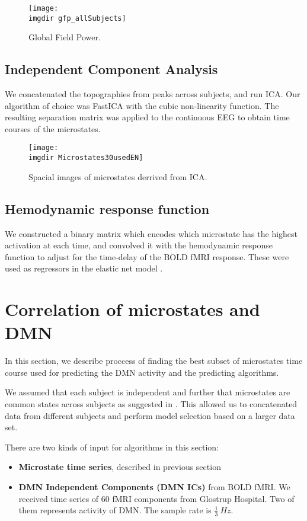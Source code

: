 \documentclass{article}
\newcommand{\imgdir}{Images/} %
\begin{document}
\begin{figure}[!ht]
    \centering
    \texttt{[image: \\imgdir gfp\_allSubjects]}
    \caption{Global Field Power.}
    \label{fig:gfp}
\end{figure}

\subsection{Independent Component Analysis}
We concatenated the topographies from peaks across subjects, and run ICA. Our algorithm of choice was FastICA \cite{fast_robust} with the cubic non-linearity function. The resulting separation matrix was applied to the continuous EEG to obtain time courses of the microstates.

\begin{figure}[!ht]
    \centering
    \texttt{[image: \\imgdir Microstates30usedEN]}
    \caption{Spacial images of microstates derrived from ICA.}
    \label{fig:microstates}
\end{figure}
\subsection{Hemodynamic response function}   
We constructed a binary matrix which encodes which microstate has the highest activation at each time, and convolved it with the hemodynamic response function to adjust for the time-delay of the BOLD fMRI response. These were used as regressors in the elastic net model \cite{hastie01}. 


\section{Correlation of microstates and DMN}
In this section, we describe proccess of finding the best subset of microstates time course used for predicting the DMN activity and the predicting algorithms.

We assumed that each subject is independent and further that microstates are common states across subjects as suggested in \cite{Yuan20122062}. This allowed us to concatenated data from different subjects and perform model selection based on a larger data set.

There are two kinds of input for algorithms in this section:
\begin{itemize}
\item \textbf{Microstate time series}, described in previous section 
\item \textbf{DMN Independent Components (DMN ICs)} from BOLD fMRI. We received time series of 60 fMRI components from Glostrup Hospital. Two of them represents activity of DMN. The sample rate is $\frac{1}{3}~Hz$. 
\end{itemize} 
\end{document}
